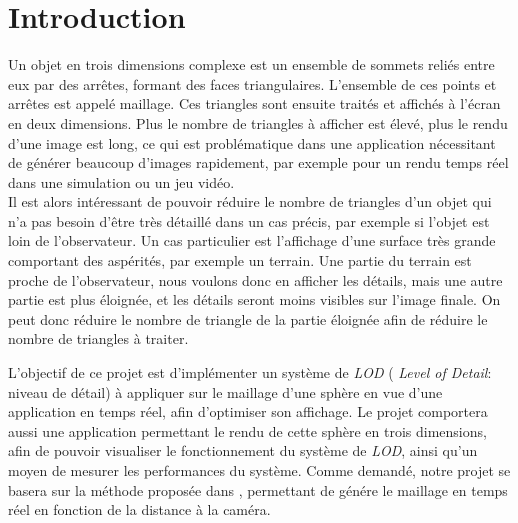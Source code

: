 \documentclass[12pt]{report}
\begin{document}



\tableofcontents

\thispagestyle{empty} %


\newpage

\chapter*{Introduction}
\setcounter{chapter}{1}

Un objet en trois dimensions complexe est un ensemble de sommets reliés
entre eux par des arrêtes, formant des faces triangulaires. L'ensemble
de ces points et arrêtes est appelé maillage. Ces triangles sont ensuite
traités et affichés à l'écran en deux dimensions. Plus le nombre de
triangles à afficher est élevé, plus le rendu d'une image est long, ce
qui est problématique dans une application nécessitant de générer
beaucoup d'images rapidement, par exemple pour un rendu temps réel dans
une simulation ou un jeu vidéo.\\
Il est alors intéressant de pouvoir réduire le nombre de triangles d'un
objet qui n'a pas besoin d'être très détaillé dans un cas précis, par
exemple si l'objet est loin de l'observateur. Un cas particulier est
l'affichage d'une surface très grande comportant des aspérités, par
exemple un terrain. Une partie du terrain est proche de l'observateur,
nous voulons donc en afficher les détails, mais une autre partie est
plus éloignée, et les détails seront moins visibles sur l'image finale.
On peut donc réduire le nombre de triangle de la partie éloignée afin de
réduire le nombre de triangles à traiter.

L'objectif de ce projet est d'implémenter un système de \emph{LOD} (
\emph{Level of Detail}: niveau de détail) à appliquer sur le maillage
d'une sphère en vue d'une application en temps réel, afin d'optimiser
son affichage. Le projet comportera aussi une application permettant le
rendu de cette sphère en trois dimensions, afin de pouvoir visualiser le
fonctionnement du système de \emph{LOD}, ainsi qu'un moyen de mesurer
les performances du système. Comme demandé, notre projet se basera sur
la méthode proposée dans \cite{CDLOD}, permettant de génére le
maillage en temps réel en fonction de la distance à la caméra. 
\end{document}
